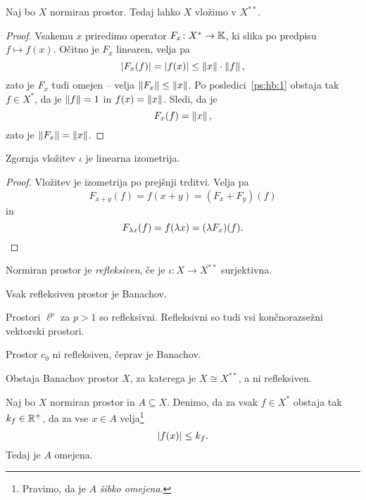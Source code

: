 \begin{trditev}
Naj bo $X$ normiran prostor. Tedaj lahko $X$ vložimo v $X^{**}$.
\end{trditev}

\begin{proof}
Vsakemu $x$ priredimo operator $F_x \colon X^* \to \mathbb{K}$, ki slika po
predpisu $f \mapsto f(x)$. Očitno je $F_x$ linearen, velja pa
\[
\left\lvert F_x(f)\right\rvert = \left\lvert f(x)\right\rvert \leq \left\lVert x\right\rVert \cdot \left\lVert f\right\rVert,
\]
zato je $F_x$ tudi omejen -- velja $\left\lVert F_x\right\rVert \leq \left\lVert x\right\rVert$. Po
posledici~\ref{ps:hb:1} obstaja tak $f \in X^*$, da je $\left\lVert f\right\rVert=1$
in $f(x) = \left\lVert x\right\rVert$. Sledi, da je
\[
F_x(f) = \left\lVert x\right\rVert,
\]
zato je $\left\lVert F_x\right\rVert = \left\lVert x\right\rVert$.
\end{proof}

\begin{trditev}
Zgornja vložitev $\iota$ je linearna izometrija.
\end{trditev}

\begin{proof}
Vložitev je izometrija po prejšnji trditvi. Velja pa
\[
F_{x+y}(f) = f(x+y) = (F_x + F_y)(f)
\]
in
\[
F_{\lambda x}(f) = f(\lambda x) = (\lambda F_x)(f). \qedhere
\]
\end{proof}

\begin{definicija}
Normiran prostor je
\emph{refleksiven}, če je
$\iota \colon X \to X^{**}$ surjektivna.
\end{definicija}

\begin{opomba}
Vsak refleksiven prostor je Banachov.
\end{opomba}

\begin{zgled}
Prostori $\ell^p$ za $p>1$ so refleksivni. Refleksivni so tudi vsi
končnorazsežni vektorski prostori.
\end{zgled}

\begin{zgled}
Prostor $c_0$ ni refleksiven, čeprav je Banachov.
\end{zgled}

\begin{opomba}
Obstaja Banachov prostor $X$, za katerega je $X \cong X^{**}$, a ni
refleksiven.
\end{opomba}

\begin{izrek}
Naj bo $X$ normiran prostor in $A \subseteq X$. Denimo, da za vsak
$f \in X^*$ obstaja tak $k_f \in \mathbb{R}^+$, da za vse $x \in A$
velja\footnote{Pravimo, da je $A$ \emph{šibko omejena}.}
\[
\left\lvert f(x)\right\rvert \leq k_f.
\]
Tedaj je $A$ omejena.
\end{izrek}

